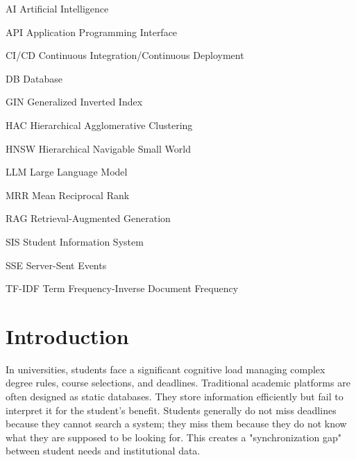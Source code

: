 \documentclass[a4paper,12pt]{article}
\begin{document}
\maketitle
{}
{}
\makeabstract
{}
{}
\maketableofcontents

{}
\makelistoffigures
{}
{}
\makelistoftables

{}
\makelistofabbrv
\begin{abbrv}
    \item[AI] Artificial Intelligence
    \item[API] Application Programming Interface
    \item[CI/CD] Continuous Integration/Continuous Deployment
    \item[DB] Database
    \item[GIN] Generalized Inverted Index
    \item[HAC] Hierarchical Agglomerative Clustering
    \item[HNSW] Hierarchical Navigable Small World
    \item[LLM] Large Language Model
    \item[MRR] Mean Reciprocal Rank
    \item[RAG] Retrieval-Augmented Generation
    \item[SIS] Student Information System
    \item[SSE] Server-Sent Events
    \item[TF-IDF] Term Frequency-Inverse Document Frequency
\end{abbrv}
\newpage

\setcounter{page}{1}

\section{Introduction}
\label{sec:intro}
In universities, students face a significant cognitive load managing complex degree rules, course selections, and deadlines. Traditional academic platforms are often designed as static databases. They store information efficiently but fail to interpret it for the student's benefit. Students generally do not miss deadlines because they cannot search a system; they miss them because they do not know what they are supposed to be looking for. This creates a "synchronization gap" between student needs and institutional data.
\end{document}

